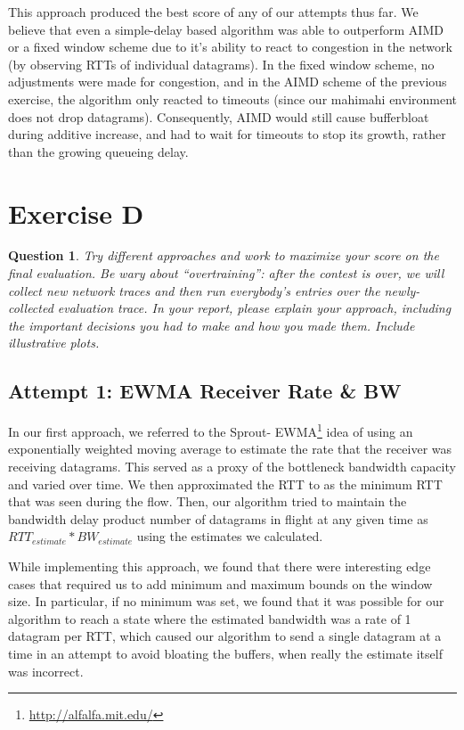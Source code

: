 \documentclass[twoside]{article}
\newtheorem{question}[theorem]{Question}
\begin{document}
This approach produced the best score of any of our attempts thus far.
We believe that even a simple-delay based algorithm was able to outperform
AIMD or a fixed window scheme due to it's ability to react to congestion in the
network (by observing RTTs of individual datagrams). In the fixed window scheme,
no adjustments were made for congestion, and in the AIMD scheme of the previous
exercise, the algorithm only reacted to timeouts (since our mahimahi
environment does not drop datagrams). Consequently, AIMD would still cause
bufferbloat during additive increase, and had to wait for timeouts to stop its
growth, rather than the growing queueing delay.

\vfill
\pagebreak

\section*{Exercise D}
\begin{question}
  Try different approaches and work to maximize your score on the final
  evaluation. Be wary about ``overtraining'': after the contest is over, we
  will collect new network traces and then run everybody's entries over the
  newly-collected evaluation trace. In your report, please explain your
  approach, including the important decisions you had to make and how you made
  them. Include illustrative plots.
\end{question}

\subsection*{Attempt 1: EWMA Receiver Rate \& BW}
In our first approach, we referred to the Sprout-
EWMA\footnote{\url{http://alfalfa.mit.edu/}} idea of using an exponentially
weighted moving average to estimate the rate that the receiver was receiving
datagrams. This served as a proxy of the bottleneck bandwidth
capacity and varied over time. We then approximated the RTT to as the minimum
RTT that was seen during the flow.
Then, our algorithm tried to maintain the bandwidth delay product number of
datagrams in flight at any given time as $RTT_{estimate} * BW_{estimate}$ using
the estimates we calculated.

While implementing this approach, we found that there were interesting edge
cases that required us to add minimum and maximum bounds on the window size.
In particular, if no minimum was set, we found that it was possible for our
algorithm to reach a state where the estimated bandwidth was a rate of 1 datagram
per RTT, which caused our algorithm to send a single datagram at a time in an
attempt to avoid bloating the buffers, when really the estimate itself
was incorrect.
\end{document}
